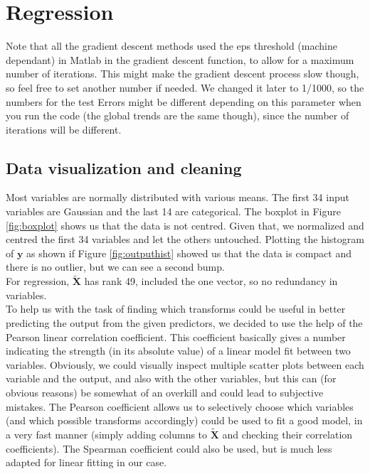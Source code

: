 \documentclass{article} %
\begin{document}
\section{Regression}
Note that all the gradient descent methods used the eps threshold (machine dependant) in Matlab in the gradient descent function, to allow for a maximum number of iterations. This might make the gradient descent process slow though, so feel free to set another number if needed. We changed it later to 1/1000, so the numbers for the test Errors might be different depending on this parameter when you run the code (the global trends are the same though), since the number of iterations will be different.
\subsection{Data visualization and cleaning}
Most variables are normally distributed with various means. The first 34 input variables are Gaussian and the last 14 are categorical. The boxplot in Figure \ref{fig:boxplot} shows us that the data is not centred. Given that, we normalized and centred the first 34 variables and let the others untouched. Plotting the histogram of $\mathbf{y}$ as shown if Figure \ref{fig:outputhist} showed us that the data is compact and there is no outlier, but we can see a second bump.\\
For regression, $\mathbf{\tilde{X}}$ has rank 49, included the one vector, so no redundancy in variables.\\

To help us with the task of finding which transforms could be useful in better predicting the output from the given predictors, we decided to use the help of the Pearson linear correlation coefficient. This coefficient basically gives a number indicating the strength (in its absolute value) of a linear model fit between two variables. Obviously, we could visually inspect multiple scatter plots between each variable and the output, and also with the other variables, but this can (for obvious reasons) be somewhat of an overkill and could lead to subjective mistakes. The Pearson coefficient allows us to selectively choose which variables (and which possible transforms accordingly) could be used to fit a good model, in a very fast manner (simply adding columns to $\mathbf{\tilde{X}}$ and checking their correlation coefficients). The Spearman coefficient could also be used, but is much less adapted for linear fitting in our case.\\
\end{document}
